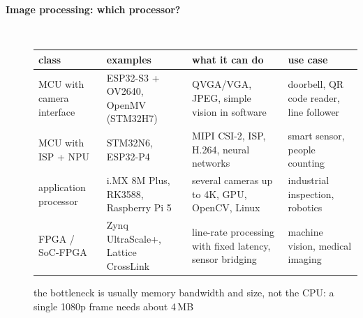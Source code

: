 \begin{description}
\item[{\rot\bf Image processing: which processor?}]~\\[-\lblskip]
\begin{center}
{\footnotesize
\begin{tabularx}{\linewidth}{|>{\raggedright}p{30mm}|L|L|L|}
\hline
\textbf{class} & \textbf{examples} & \textbf{what it can do} & \textbf{use case} \\
\hline
MCU with camera interface & ESP32-S3 + OV2640, OpenMV (STM32H7) & QVGA/VGA, JPEG, simple vision in software & doorbell, QR code reader, line follower \\
MCU with ISP + NPU & STM32N6, ESP32-P4 & MIPI CSI-2, ISP, H.264, neural networks & smart sensor, people counting \\
application processor & i.MX 8M Plus, RK3588, Raspberry Pi 5 & several cameras up to 4K, GPU, OpenCV, Linux & industrial inspection, robotics \\
FPGA / SoC-FPGA & Zynq UltraScale+, Lattice CrossLink & line-rate processing with fixed latency, sensor bridging & machine vision, medical imaging \\
\hline
\end{tabularx}}
\end{center}
\bi
	\ite the bottleneck is usually memory bandwidth and size, not the CPU: a single 1080p frame needs about 4\,MB
\ei
\os{\newpage}


\end{description}
